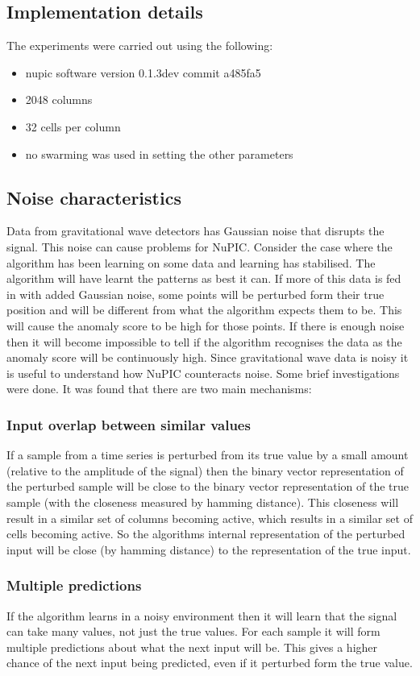 \documentclass[a4paper]{jpconf}
\begin{document}
		
	\subsection{Implementation details}
		The experiments were carried out using the following:
		\begin{itemize}
		\item nupic software version 0.1.3dev commit a485fa5
		\item 2048 columns
		\item 32 cells per column
		\item no swarming was used in setting the other parameters
		\end{itemize}

	\subsection{Noise characteristics}
		Data from gravitational wave detectors has Gaussian noise that disrupts the signal. This noise can cause problems for NuPIC. Consider the case where the algorithm has been learning on some data and learning has stabilised. The algorithm will have learnt the patterns as best it can. If more of this data is fed in with added Gaussian noise, some points will be perturbed form their true position and will be different from what the algorithm expects them to be. This will cause the anomaly score to be high for those points. If there is enough noise then it will become impossible to tell if the algorithm recognises the data as the anomaly score will be continuously high. Since gravitational wave data is noisy it is useful to understand how NuPIC counteracts noise.
		Some brief investigations were done. It was found that there are two main mechanisms:
		\subsubsection*{Input overlap between similar values}
			If a sample from a time series is perturbed from its true value by a small amount (relative to the amplitude of the signal) then the binary vector representation of the perturbed sample will be close to the binary vector representation of the true sample (with the closeness measured by hamming distance). This closeness will result in a similar set of columns becoming active, which results in a similar set of cells becoming active. So the algorithms internal representation of the perturbed input will be close (by hamming distance) to the representation of the true input.
		\subsubsection*{Multiple predictions}
			If the algorithm learns in a noisy environment then it will learn that the signal can take many values, not just the true values. For each sample it will form multiple predictions about what the next input will be. This gives a higher chance of the next input being predicted, even if it perturbed form the true value.
			
\end{document}
